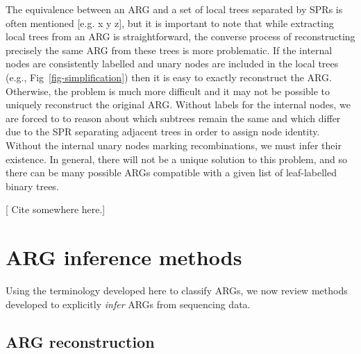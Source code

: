 \documentclass{article}
\begin{document}
The equivalence between an ARG and a set of local trees
separated by SPRs is often mentioned [e.g. x y z], but
it is important to note that while extracting local
trees from an ARG is straightforward, the converse
process of reconstructing precisely the same ARG from
these trees is more problematic. If the internal
nodes are consistently labelled and unary nodes are
included in the local trees (e.g., Fig~\ref{fig-simplification})
then it is easy to exactly reconstruct the ARG.
Otherwise, the problem is much more difficult and it
may not be possible to uniquely reconstruct the original ARG.
Without labels for the internal nodes, we are forced to
to reason about which subtrees remain the same and which
differ due to the SPR separating adjacent trees in order to
assign node identity. Without the internal unary nodes marking
recombinations, we must infer their existence. In
general, there will not be a unique solution to this problem,
and so there can be many possible ARGs compatible with
a given list of
leaf-labelled binary trees.

[ Cite \citep{deng2021distribution} somewhere here.]


\section*{ARG inference methods}\label{ARG_inference_methods}
Using the terminology developed here to classify ARGs, we now review methods developed
to explicitly \emph{infer} ARGs from sequencing data.

\subsection*{ARG reconstruction}
\end{document}
